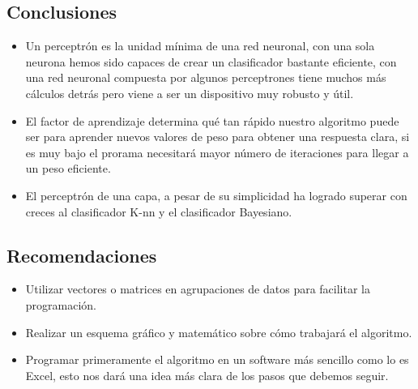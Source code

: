 \documentclass[10pt,a4paper]{article}
\begin{document}
\subsection*{Conclusiones}
\begin{itemize}
\item Un perceptrón es la unidad mínima de una red neuronal, con una sola neurona hemos sido capaces de crear un clasificador bastante eficiente, con una red neuronal compuesta por algunos perceptrones tiene muchos más cálculos detrás pero viene a ser un dispositivo muy robusto y útil.
\item El factor de aprendizaje determina qué tan rápido nuestro algoritmo puede ser para aprender nuevos valores de peso para obtener una respuesta clara, si es muy bajo el prorama necesitará mayor número de iteraciones para llegar a un peso eficiente.
\item El perceptrón de una capa, a pesar de su simplicidad ha logrado superar con creces al clasificador K-nn y el clasificador Bayesiano.
\end{itemize}

\subsection*{Recomendaciones}
\begin{itemize}
\renewcommand{\labelitemi}{$*$}
\item Utilizar vectores o matrices en agrupaciones de datos para facilitar la programación.
\item Realizar un esquema gráfico y matemático sobre cómo trabajará el algoritmo.
\item Programar primeramente el algoritmo en un software más sencillo como lo es Excel, esto nos dará una idea más clara de los pasos que debemos seguir.
\end{itemize}




\end{document}
